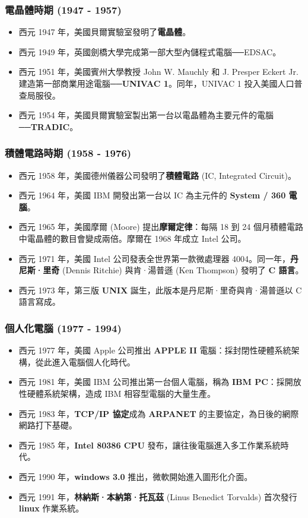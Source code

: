 \documentclass[12pt,a4paper,oneside]{book}
\begin{document}
\begin{CJK}{UTF8}{bkai}
\subsubsection{電晶體時期 (1947 - 1957)}
\begin{itemize}
\item 西元 1947 年，美國貝爾實驗室發明了\textbf{電晶體}。
\item 西元 1949 年，英國劍橋大學完成第一部大型內儲程式電腦──EDSAC。
\item 西元 1951 年，美國賓州大學教授 John W. Mauchly 和 J. Presper Eckert Jr. 建造第一部商業用途電腦──\textbf{UNIVAC 1}。同年，UNIVAC 1 投入美國人口普查局服役。
\item 西元 1954 年，美國貝爾實驗室製出第一台以電晶體為主要元件的電腦──\textbf{TRADIC}。
\end{itemize}

\subsubsection{積體電路時期 (1958 - 1976)}
\begin{itemize}
\item 西元 1958 年，美國德州儀器公司發明了\textbf{積體電路} (IC, Integrated Circuit)。
\item 西元 1964 年，美國 IBM 開發出第一台以 IC 為主元件的 \textbf{System / 360 電腦}。
\item 西元 1965 年，美國摩爾 (Moore) 提出\textbf{摩爾定律}：每隔 18 到 24 個月積體電路中電晶體的數目會變成兩倍。摩爾在 1968 年成立 Intel 公司。
\item 西元 1971 年，美國 Intel 公司發表全世界第一款微處理器 4004。同一年，\textbf{丹尼斯·里奇} (Dennis Ritchie) 與肯·湯普遜 (Ken Thompson) 發明了 \textbf{C 語言}。
\item 西元 1973 年，第三版 \textbf{UNIX} 誕生，此版本是丹尼斯·里奇與肯·湯普遜以 C 語言寫成。
\end{itemize}

\subsubsection{個人化電腦 (1977 - 1994)}
\begin{itemize}
\item 西元 1977 年，美國 Apple 公司推出 \textbf{APPLE II} 電腦：採封閉性硬體系統架構，從此進入電腦個人化時代。
\item 西元 1981 年，美國 IBM 公司推出第一台個人電腦，稱為 \textbf{IBM PC}：採開放性硬體系統架構，造成 IBM 相容型電腦的大量生產。
\item 西元 1983 年，\textbf{TCP/IP 協定}成為 \textbf{ARPANET} 的主要協定，為日後的網際網路打下基礎。
\item 西元 1985 年，\textbf{Intel 80386 CPU} 發布，讓往後電腦進入多工作業系統時代。
\item 西元 1990 年，\textbf{windows 3.0} 推出，微軟開始進入圖形化介面。
\item 西元 1991 年，\textbf{林納斯·本納第·托瓦茲} (Linus Benedict Torvalds) 首次發行 \textbf{linux} 作業系統。
\end{itemize}


\end{CJK}
\end{document}
